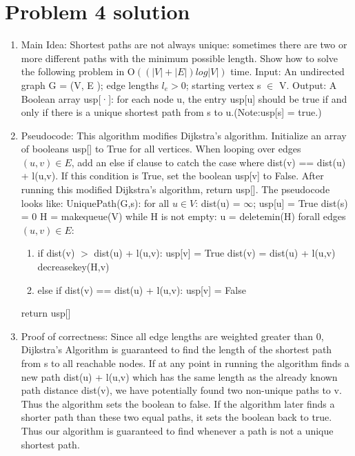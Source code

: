 \documentclass[11pt]{article}
\begin{document}
\section*{Problem 4 solution}
\begin{enumerate}
\item Main Idea:
Shortest paths are not always unique: sometimes there are two or more different paths with the minimum possible length. Show how to solve the following problem in O$((|V | + |E |) log |V |)$ time.\newline
Input: An undirected graph G = (V, E ); edge lengths $l_e > 0$; starting vertex s $\in$ V.\newline
Output: A Boolean array usp[·]: for each node u, the entry usp[u] should be true if and only if there
is a unique shortest path from s to u.(Note:usp[s] = true.)
\item Pseudocode: This algorithm modifies Dijkstra's algorithm. Initialize an array of booleans usp[] to True for all vertices. When looping over edges $(u,v)\in E$, add an else if clause to catch the case where dist(v) == dist(u) + l(u,v). If this condition is True, set the boolean usp[v] to False. After running this modified Dijkstra's algorithm, return usp[]. The pseudocode looks like:\newline
UniquePath(G,s):\newline
for all $u \in V$: dist(u) = $\infty$; usp[u] = True\newline
dist(s) = 0\newline
H = makequeue(V)\newline
while H is not empty:\newline
  u = deletemin(H)\newline
  forall edges $(u,v) \in E$:
    \begin{enumerate}
    \item if dist(v) $>$ dist(u) + l(u,v):\newline
      usp[v] = True
      dist(v) = dist(u) + l(u,v)\newline
      decreasekey(H,v)\newline
    \item else if dist(v) == dist(u) + l(u,v):\newline
      usp[v] = False
    \end{enumerate}
return usp[]\newline
\item Proof of correctness: Since all edge lengths are weighted greater than 0, Dijkstra's Algorithm is guaranteed to find the length of the shortest path from s to all reachable nodes. If at any point in running the algorithm finds a new path dist(u) + l(u,v) which has the same length as the already known path distance dist(v), we have potentially found two non-unique paths to v. Thus the algorithm sets the boolean to false. If the algorithm later finds a shorter path than these two equal paths, it sets the boolean back to true. Thus our algorithm is guaranteed to find whenever a path is not a unique shortest path.

\end{enumerate}
\end{document}

